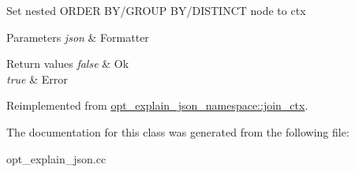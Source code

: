 Set nested O\+R\+D\+ER B\+Y/\+G\+R\+O\+UP B\+Y/\+D\+I\+S\+T\+I\+N\+CT node to {\ttfamily ctx} 


\begin{DoxyParams}{Parameters}
{\em json} & Formatter\\
\hline
\end{DoxyParams}

\begin{DoxyRetVals}{Return values}
{\em false} & Ok \\
\hline
{\em true} & Error \\
\hline
\end{DoxyRetVals}


Reimplemented from \mbox{\hyperlink{classopt__explain__json__namespace_1_1join__ctx_a4da472e6a104b4e13dbc0a39450b4a95}{opt\+\_\+explain\+\_\+json\+\_\+namespace\+::join\+\_\+ctx}}.



The documentation for this class was generated from the following file\+:\begin{DoxyCompactItemize}
\item 
opt\+\_\+explain\+\_\+json.\+cc\end{DoxyCompactItemize}
